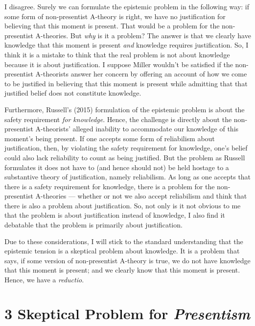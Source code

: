 \documentclass[a4paper,12pt]{article}
\begin{document}
I disagree. Surely we can formulate the epistemic problem in the following way: if some form of non-presentist A-theory is right, we have no justification for believing that this moment is present. That would be a problem for the non-presentist A-theories. But \emph{why} is it a problem? The answer is that we clearly have knowledge that this moment is present \emph{and} knowledge requires justification. So, I think it is a mistake to think that the real problem is not about knowledge because it is about justification. I suppose Miller wouldn't be satisfied if the non-presentist A-theorists answer her concern by offering an account of how we come to be justified in believing that this moment is present while admitting that that justified belief does not constitute knowledge.

Furthermore, Russell's (2015) formulation of the epistemic problem is about the safety requirement \emph{for knowledge}. Hence, the challenge is directly about the non-presentist A-theorists' alleged inability to accommodate our knowledge of this moment's being present. If one accepts some form of reliabilism about justification, then, by violating the safety requirement for knowledge, one's belief could also lack reliability to count as being justified. But the problem as Russell formulates it does not have to (and hence should not) be held hostage to a substantive theory of justification, namely reliabilism. As long as one accepts that there is a safety requirement for knowledge, there is a problem for the non-presentist A-theories --- whether or not we also accept reliabilism and think that there is also a problem about justification. So, not only is it not obvious to me that the problem is about justification instead of knowledge, I also find it debatable that the problem is primarily about justification.

Due to these considerations, I will stick to the standard understanding that the epistemic tension is a skeptical problem about knowledge. It is a problem that says, if some version of non-presentist A-theory is true, we do not have knowledge that this moment is present; and we clearly know that this moment is present. Hence, we have a \emph{reductio}.

\section*{3 Skeptical Problem for \emph{Presentism}}
\end{document}
